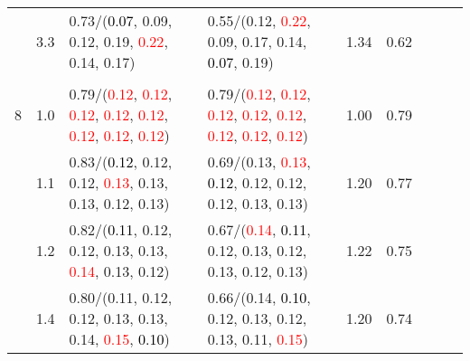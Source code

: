 \documentclass[10pt,a4paper]{report}
\begin{document}
\begin{table}[!htbp]
\begin{center}
{\begin{tabular}{ccllccccc}
				  & 3.3                               & 0.73/(\textcolor{black}{0.07}, 0.09, 0.12, 0.19, \textcolor{red}{0.22}, 0.14, 0.17)                                                                                                           & 0.55/(0.12, \textcolor{red}{0.22}, 0.09, 0.17, 0.14, \textcolor{black}{0.07}, 0.19)                                                                                                           & 1.34             & 0.62                     \\
				  &                                   &                                                                                                                                                                                               &                                                                                                                                                                                               &                                             \\
				8 & 1.0                               & 0.79/(\textcolor{red}{0.12}, \textcolor{red}{0.12}, \textcolor{red}{0.12}, \textcolor{red}{0.12}, \textcolor{red}{0.12}, \textcolor{red}{0.12}, \textcolor{red}{0.12}, \textcolor{red}{0.12}) & 0.79/(\textcolor{red}{0.12}, \textcolor{red}{0.12}, \textcolor{red}{0.12}, \textcolor{red}{0.12}, \textcolor{red}{0.12}, \textcolor{red}{0.12}, \textcolor{red}{0.12}, \textcolor{red}{0.12}) & 1.00             & 0.79                     \\
				  & 1.1                               & 0.83/(\textcolor{black}{0.12}, 0.12, 0.12, \textcolor{red}{0.13}, 0.13, 0.13, 0.12, 0.13)                                                                                                     & 0.69/(0.13, \textcolor{red}{0.13}, \textcolor{black}{0.12}, 0.12, 0.12, 0.12, 0.13, 0.13)                                                                                                     & 1.20             & 0.77                     \\
				  & 1.2                               & 0.82/(\textcolor{black}{0.11}, 0.12, 0.12, 0.13, 0.13, \textcolor{red}{0.14}, 0.13, 0.12)                                                                                                     & 0.67/(\textcolor{red}{0.14}, \textcolor{black}{0.11}, 0.12, 0.13, 0.12, 0.13, 0.12, 0.13)                                                                                                     & 1.22             & 0.75                     \\
				  & 1.4                               & 0.80/(0.11, 0.12, 0.12, 0.13, 0.13, 0.14, \textcolor{red}{0.15}, \textcolor{black}{0.10})                                                                                                     & 0.66/(0.14, \textcolor{black}{0.10}, 0.12, 0.13, 0.12, 0.13, 0.11, \textcolor{red}{0.15})                                                                                                     & 1.20             & 0.74                     \\

\end{tabular}}
\end{center}
\end{table}
\end{document}
